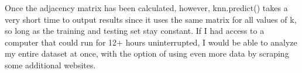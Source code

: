 \documentclass[]{article}
\begin{document}
		Once the adjacency matrix has been calculated, however, knn.predict() takes a very short time to output results since it uses the same matrix for all values of k, so long as the training and testing set stay constant. If I had access to a computer that could run for 12+ hours uninterrupted, I would be able to analyze my entire dataset at once, with the option of using even more data by scraping some additional websites.
		
		
		
		
		
		
		
		
	
	
\end{document}
